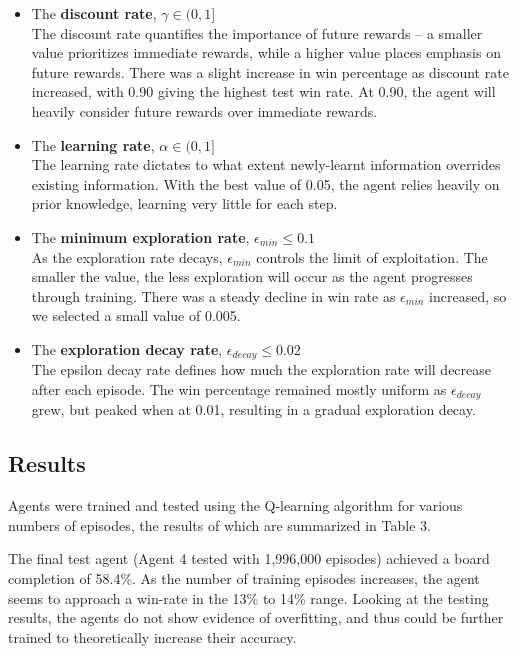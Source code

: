 \begin{itemize}
  \item {
    The \textbf{discount rate}, $\gamma \in (0, 1]$\\
    The discount rate quantifies the importance of future rewards -- a smaller value prioritizes immediate rewards, while a higher value places emphasis on future rewards. 
    There was a slight increase in win percentage as discount rate increased, with 0.90 giving the highest test win rate. 
    At 0.90, the agent will heavily consider future rewards over immediate rewards.
    
  }
  \item {
    The \textbf{learning rate}, $\alpha \in (0, 1]$\\
    The learning rate dictates to what extent newly-learnt information overrides existing information.
    With the best value of 0.05, the agent relies heavily on prior knowledge, learning very little for each step.
    
  }
  \item {
    The \textbf{minimum exploration rate}, $\epsilon_{min} \leq 0.1$\\
    As the exploration rate decays, $\epsilon_{min}$ controls the limit of exploitation. 
    The smaller the value, the less exploration will occur as the agent progresses through training.  
    There was a steady decline in win rate as $\epsilon_{min}$ increased, so we selected a small value of 0.005.
  }
  \item {
    The \textbf{exploration decay rate}, $\epsilon_{decay} \leq 0.02$\\
    The epsilon decay rate defines how much the exploration rate will decrease after each episode.
    The win percentage remained mostly uniform as $\epsilon_{decay}$ grew, but peaked when at 0.01, resulting in a gradual exploration decay.
  }
\end{itemize}



\subsection{Results}

Agents were trained and tested using the Q-learning algorithm for various numbers of episodes, the results of which are summarized in Table 3.



The final test agent (Agent 4 tested with 1,996,000 episodes) achieved a board completion of 58.4\%.
As the number of training episodes increases, the agent seems to approach a win-rate in the 13\% to 14\% range. Looking at the testing results, the agents do not show evidence of overfitting, and thus could be further trained to theoretically increase their accuracy. 
